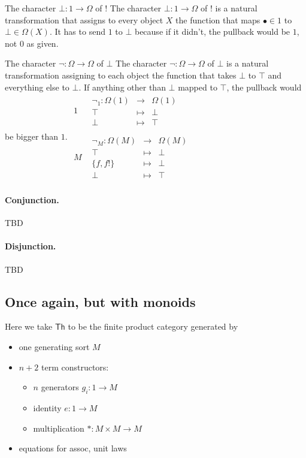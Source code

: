 \begin{remark}
The character $\bot\colon 1 \to \Omega$ of $!$
  The character $\bot\colon 1 \to \Omega$ of $!$ is a natural transformation that assigns to every object $X$ the function that maps $\bullet \in 1$ to $\bot \in \Omega(X)$.  It has to send $1$ to $\bot$ because if it didn't, the pullback would be $1$, not $0$ as given.
\end{remark}

\begin{remark}
The character $\neg\colon \Omega \to \Omega$ of $\bot$
The character $\neg\colon \Omega \to \Omega$ of $\bot$ is a natural transformation assigning to each object the function that takes $\bot$ to $\top$ and everything else to $\bot$. If anything other than $\bot$ mapped to $\top$, the pullback would be bigger than $1$.
$\begin{array}{cc}1&\begin{array}{rcl}\neg_1\colon\Omega(1)&\to&\Omega(1)\\ \top &\mapsto &\bot\\ \bot &\mapsto & \top\end{array}\\\\ M & \begin{array}{rcl}\neg_M\colon\Omega(M)&\to&\Omega(M)\\\top & \mapsto & \bot \\ \{f,f!\} & \mapsto & \bot \\\bot & \mapsto & \top\end{array}\end{array}$
\end{remark}

\paragraph{Conjunction.}
TBD

\paragraph{Disjunction.}
TBD

\subsection{Once again, but with monoids}

Here we take $\mathsf{Th}$ to be the finite product category generated by
\begin{itemize}
  \item one generating sort $M$
  \item $n+2$ term constructors:
    \begin{itemize}
      \item $n$ generators $g_{i}: 1 \to M$
      \item identity $e: 1 \to M$
      \item multiplication $*: M \times M \to M$
    \end{itemize}
  \item equations for assoc, unit laws
\end{itemize}

